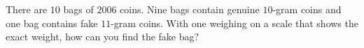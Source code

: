 There are $10$ bags of $2006$ coins. Nine bags contain genuine $10$-gram coins and one bag contains fake $11$-gram coins. With one weighing on a scale that shows the exact weight, how can you find the fake bag?
